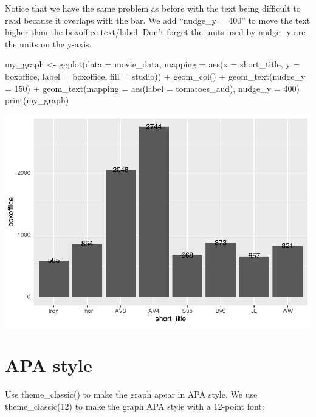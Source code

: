 \documentclass[
]{krantz}
\makeatletter
\newenvironment{Shaded}{\begin{snugshade}}{\end{snugshade}}
\newcommand{\AttributeTok}[1]{\textcolor[rgb]{0.61,0.61,0.61}{#1}}
\newcommand{\DecValTok}[1]{\textcolor[rgb]{0.06,0.06,0.06}{#1}}
\newcommand{\FunctionTok}[1]{\textcolor[rgb]{0,0,0}{#1}}
\newcommand{\NormalTok}[1]{#1}
\newcommand{\OtherTok}[1]{\textcolor[rgb]{0.37,0.37,0.37}{#1}}
\newcommand{\SpecialCharTok}[1]{\textcolor[rgb]{0,0,0}{#1}}
\newenvironment{kframe}{%
\medskip{}
\setlength{\fboxsep}{.8em}
 \def\at@end@of@kframe{}%
 \ifinner\ifhmode%
  \def\at@end@of@kframe{\end{minipage}}%
  \begin{minipage}{\columnwidth}%
 \fi\fi%
 \def\FrameCommand##1{\hskip\@totalleftmargin \hskip-\fboxsep
 \colorbox{shadecolor}{##1}\hskip-\fboxsep
     \hskip-\linewidth \hskip-\@totalleftmargin \hskip\columnwidth}%
 \MakeFramed {\advance\hsize-\width
   \@totalleftmargin\z@ \linewidth\hsize
   \@setminipage}}%
 {\par\unskip\endMakeFramed%
 \at@end@of@kframe}
\renewenvironment{Shaded}{\begin{kframe}}{\end{kframe}}
\makeatother
\begin{document}
Notice that we have the same problem as before with the text being difficult to read because it overlaps with the bar. We add ``nudge\_y = 400'' to move the text higher than the boxoffice text/label. Don't forget the units used by nudge\_y are the units on the y-axis.

\begin{Shaded}
\begin{Highlighting}[]
\NormalTok{my\_graph }\OtherTok{\textless{}{-}} \FunctionTok{ggplot}\NormalTok{(}\AttributeTok{data =}\NormalTok{ movie\_data,}
           \AttributeTok{mapping =} \FunctionTok{aes}\NormalTok{(}\AttributeTok{x =}\NormalTok{ short\_title,}
                         \AttributeTok{y =}\NormalTok{ boxoffice,}
                         \AttributeTok{label =}\NormalTok{ boxoffice, }
                         \AttributeTok{fill =}\NormalTok{ studio)) }\SpecialCharTok{+}
  \FunctionTok{geom\_col}\NormalTok{() }\SpecialCharTok{+}
  \FunctionTok{geom\_text}\NormalTok{(}\AttributeTok{nudge\_y =} \DecValTok{150}\NormalTok{)  }\SpecialCharTok{+}
  \FunctionTok{geom\_text}\NormalTok{(}\AttributeTok{mapping =} \FunctionTok{aes}\NormalTok{(}\AttributeTok{label =}\NormalTok{ tomatoes\_aud), }
            \AttributeTok{nudge\_y =} \DecValTok{400}\NormalTok{) }
\FunctionTok{print}\NormalTok{(my\_graph)}
\end{Highlighting}
\end{Shaded}

\includegraphics[width=0.65\linewidth]{bookdown_files/figure-latex/unnamed-chunk-115-1}

\newpage

\hypertarget{apa-style}{%
\section{APA style}\label{apa-style}}

Use theme\_classic() to make the graph apear in APA style. We use theme\_classic(12) to make the graph APA style with a 12-point font:
\end{document}
